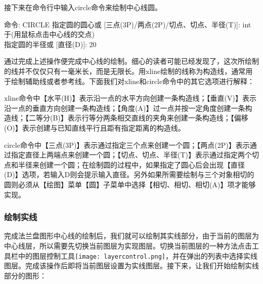 接下来在命令行中输入circle命令来绘制中心线圆。

\noindent
命令: CIRCLE 指定圆的圆心或 [三点(3P)/两点(2P)/切点、切点、半径(T)]: int 于(用鼠标点击中心线的交点)\\
指定圆的半径或 [直径(D)]: 20\\
\indent

通过完成上述操作便完成中心线的绘制。细心的读者可能已经发现了，这次所绘制的线并不仅仅只有一毫米长，而是无限长。用xline绘制的线称为构造线，通常用于绘制辅助线或者参考线。下面我们对xline和circle命令中的其它选项进行解释：

xline命令中【水平(H)】表示沿一点的水平方向创建一条构造线；【垂直(V)】表示沿一点的垂直方向创建一条构造线；【角度(A)】过一点并按一定角度创建一条构造线；【二等分(B)】表示行等分两条相交直线的夹角来创建一条构造线；【偏移(O)】表示创建与已知直线平行且距有指定距离的构造线。

circle命令中【三点(3P)】表示通过指定三个点来创建一个圆；【两点(2P)】表示通过指定直径上两端点来创建一个圆；【切点、切点、半径(T)】表示通过指定两个切点和半径来创建一个圆；在绘制圆的过程中，如果指定了圆心后会出现【直径(D)】选项，若输入D则会提示输入直径。另外如果所需要绘制与三个对象相切的圆则必须从【绘图】菜单【圆】子菜单中选择【相切、相切、相切(A)】项才能够实现。
\subsubsection{绘制实线}
完成法兰盘图形中心线的绘制后，我们就可以绘制其实线部分，由于当前的图层为中心线层，所以需要先切换当前图层为实现图层。切换当前图层的一种方法点击工具栏中的图层控制工具\texttt{[image: layercontrol.png]}，并在弹出的列表中选择实线图层。完成该操作后即将当前图层设置为实线图层。接下来，让我们开始绘制实线部分的图形：


